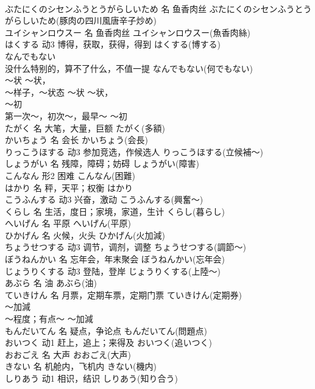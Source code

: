 \documentclass[8pt]{extreport}
\begin{document}
\begin{CJK}{UTF8}{min}
\\	ぶたにくのシセンふうとうがらしいため	名	鱼香肉丝	ぶたにくのシセンふうとうがらしいため(豚肉の四川風唐辛子炒め)	
\\	ユイシャンロウスー	名	鱼香肉丝	ユイシャンロウスー(魚香肉絲)	
\\	はくする	动3	博得，获取，获得，得到	はくする(博する)	
\\	なんでもない	
\\	没什么特别的，算不了什么，不值一提	なんでもない(何でもない)	
\\	～状 ～状，	
\\	～样子，～状态	～状 ～状，	
\\	～初	
\\	第一次～，初次～，最早～	～初	
\\	たがく	名	大笔，大量，巨额	たがく(多額)	
\\	かいちょう	名	会长	かいちょう(会長)	
\\	りっこうほする	动3	参加竞选，作候选人	りっこうほする(立候補～)	
\\	しょうがい	名	残障，障碍；妨碍	しょうがい(障害)	
\\	こんなん	形2	困难	こんなん(困難)	
\\	はかり	名	秤，天平；权衡	はかり	
\\	こうふんする	动3	兴奋，激动	こうふんする(興奮～)	
\\	くらし	名	生活，度日；家境，家道，生计	くらし(暮らし)	
\\	へいげん	名	平原	へいげん(平原)	
\\	ひかげん	名	火候，火头	ひかげん(火加減)	
\\	ちょうせつする	动3	调节，调剂，调整	ちょうせつする(調節～)	
\\	ぼうねんかい	名	忘年会，年末聚会	ぼうねんかい(忘年会)	
\\	じょうりくする	动3	登陆，登岸	じょうりくする(上陸～)	
\\	あぶら	名	油	あぶら(油)	
\\	ていきけん	名	月票，定期车票，定期门票	ていきけん(定期券)	
\\	～加減	
\\	～程度；有点～	～加減	
\\	もんだいてん	名	疑点，争论点	もんだいてん(問題点)	
\\	おいつく	动1	赶上，追上；来得及	おいつく(追いつく)	
\\	おおごえ	名	大声	おおごえ(大声)	
\\	きない	名	机舱内，飞机内	きない(機内)	
\\	しりあう	动1	相识，结识	しりあう(知り合う)	

\end{CJK}
\end{document}
